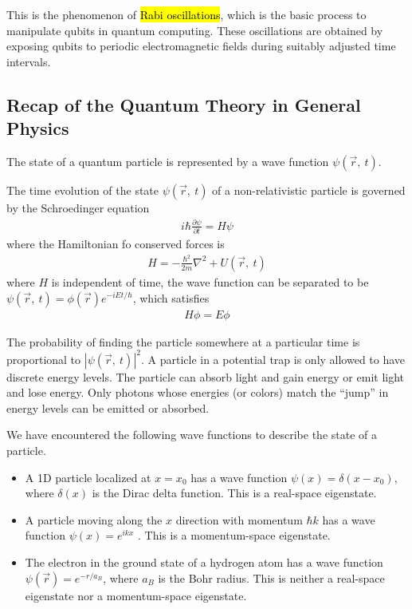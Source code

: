 This is the phenomenon of \hl{Rabi oscillations}, which is the basic process to manipulate qubits in quantum computing. These oscillations are obtained by exposing qubits to periodic electromagnetic fields during suitably adjusted time intervals.

\subsection{Recap of the Quantum Theory in General Physics}
The state of a quantum particle is represented by a wave function $\psi(\vec{r},\ t)$. 

The time evolution of the state $\psi(\vec{r},\ t)$ of a non-relativistic particle is governed by the Schroedinger equation
\begin{align*}
    i\hbar\frac{\partial \psi}{\partial t}=H\psi
\end{align*}
where the Hamiltonian fo conserved forces is 
\begin{align*}
    H=-\frac{\hbar^2}{2m}\nabla^2 +U(\vec{r},\ t)
\end{align*}
where $H$ is independent of time, the wave function can be separated to be $\psi(\vec{r},\ t)=\phi(\vec{r})e^{-iEt/\hbar}$, which satisfies
\begin{align*}
    H\phi=E\phi
\end{align*}

The probability of finding the particle somewhere at a particular time is proportional to $|\psi(\vec{r},\ t)|^2$. A particle in a potential trap is only allowed to have discrete energy levels. The particle can absorb light and gain energy or emit light and lose energy. Only photons whose energies (or colors) match the ``jump'' in energy levels can be emitted or absorbed. 

We have encountered the following wave functions to describe the state of a particle. 
\begin{itemize}
    \item A 1D particle localized at $x = x_0$ has a wave function $\psi(x ) = \delta(x - x_0)$, where $\delta(x)$ is the Dirac delta function. This is a real-space eigenstate. 
    \item A particle moving along the $x$ direction with momentum $\hbar k$ has a wave function $\psi(x ) = e^{ikx}$ . This is a momentum-space eigenstate. 
    \item The electron in the ground state of a hydrogen atom has a wave function $\psi(\vec{r})=e^{-r/a_B}$, where $a_B$ is the Bohr radius. This is neither a real-space eigenstate nor a momentum-space eigenstate. 
\end{itemize}

